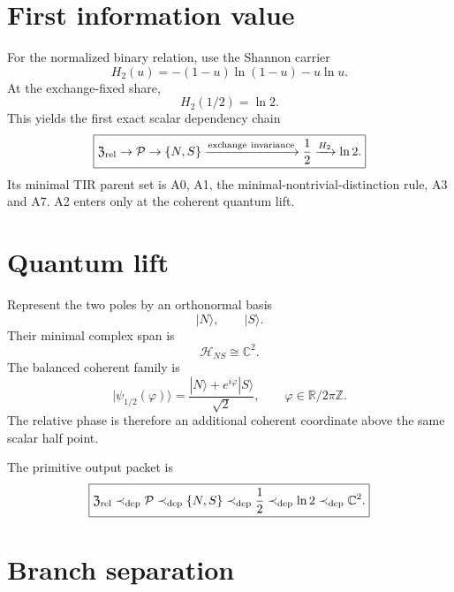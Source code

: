 \section{First information value}

For the normalized binary relation, use the Shannon carrier
\begin{equation}
H_2(u)=-(1-u)\ln(1-u)-u\ln u.
\end{equation}
At the exchange-fixed share,
\begin{equation}
\boxed{H_2(1/2)=\ln2.}
\label{eq:v12_first_ln2}
\end{equation}
This yields the first exact scalar dependency chain
\begin{equation}
\boxed{
\mathfrak Z_{\rm rel}
\rightarrow
\mathcal P
\rightarrow
\{N,S\}
\xrightarrow{\rm exchange\ invariance}
\frac12
\xrightarrow{H_2}
\ln2.
}
\label{eq:v12_primitive_scalar_chain}
\end{equation}
Its minimal TIR parent set is A0, A1, the minimal-nontrivial-distinction rule, A3 and A7. A2 enters only at the coherent quantum lift.

\section{Quantum lift}

Represent the two poles by an orthonormal basis
\[
|N\rangle,\qquad |S\rangle.
\]
Their minimal complex span is
\begin{equation}
\boxed{\mathcal H_{NS}\cong\mathbb C^2.}
\label{eq:v12_binary_c2}
\end{equation}
The balanced coherent family is
\begin{equation}
\boxed{
|\psi_{1/2}(\varphi)\rangle
=\frac{|N\rangle+e^{i\varphi}|S\rangle}{\sqrt2},
\qquad
\varphi\in\mathbb R/2\pi\mathbb Z.
}
\label{eq:v12_balanced_spinor}
\end{equation}
The relative phase is therefore an additional coherent coordinate above the same scalar half point.

The primitive output packet is
\begin{equation}
\boxed{
\mathfrak Z_{\rm rel}
\prec_{\rm dep}
\mathcal P
\prec_{\rm dep}
\{N,S\}
\prec_{\rm dep}
\frac12
\prec_{\rm dep}
\ln2
\prec_{\rm dep}
\mathbb C^2.
}
\label{eq:v12_primitive_packet}
\end{equation}

\section{Branch separation}

